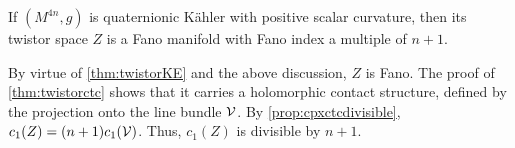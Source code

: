 \begin{cor}\label{cor:twistorfano}
	If $(M^{4n},g)$ is quaternionic K\"ahler with positive scalar curvature, then its twistor space $Z$ is a Fano manifold with Fano index a multiple of $n+1$.
\end{cor}
\begin{myproof}
	By virtue of \cref{thm:twistorKE} and the above discussion, $Z$ is Fano. The proof of \cref{thm:twistorctc} shows that it carries a holomorphic contact structure, defined by the projection onto the line bundle $\mathcal{V}$. By \cref{prop:cpxctcdivisible}, $c_1(Z)=(n+1)c_1(\mathcal{V})$. Thus, $c_1(Z)$ is divisible by $n+1$.
\end{myproof}


